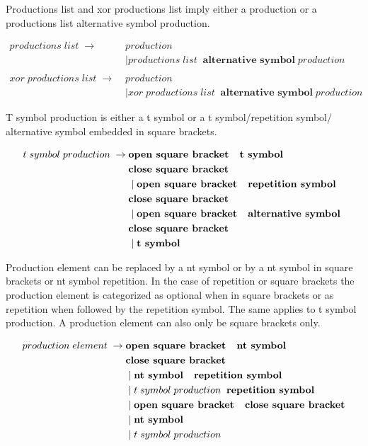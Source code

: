 Productions list and xor productions list imply either a production or a productions list alternative symbol production.

\begin{align*}
	productions\;list\; \rightarrow\; &production \\
               &\mid productions\;list\;\;\textbf{alternative symbol} \;production \\ \\                   
	xor\;productions\;list\; \rightarrow\; &production \\
               &\mid xor\;productions\;list\;\;\textbf{alternative symbol}\;production 
\end{align*}

T symbol production is either a t symbol or a t symbol/repetition symbol/ alternative symbol embedded in square brackets.

\begin{align*}
	t\;symbol\;production\; \rightarrow\; & \textbf{open square bracket \; t symbol} \\ &\textbf{close square bracket}\\
               &\mid \textbf{open square bracket \; repetition symbol} \\ &\textbf{close square bracket}\\
               &\mid \textbf{open square bracket \; alternative symbol } \\ &\textbf{close square bracket}\\
               &\mid \textbf{t symbol} 
\end{align*}

Production element can be replaced by a nt symbol or by a nt symbol in square brackets or nt symbol repetition. In the case of repetition or square brackets the production element is categorized as optional when in square brackets or as repetition when followed by the repetition symbol. The same applies to t symbol production. A production element can also only be square brackets only.

 

\begin{align*}
	production\;element\; \rightarrow\; & \textbf{open square bracket \; nt symbol} \\ 
			   &\textbf{close square bracket}\\
               &\mid \textbf{nt symbol \; repetition symbol} \\
               &\mid t\;symbol\;production\;\; \textbf{repetition symbol} \\
               &\mid \textbf{open square bracket \; close square bracket} \\
               &\mid \textbf{nt symbol} \\
               &\mid t\; symbol\; production 
\end{align*}




